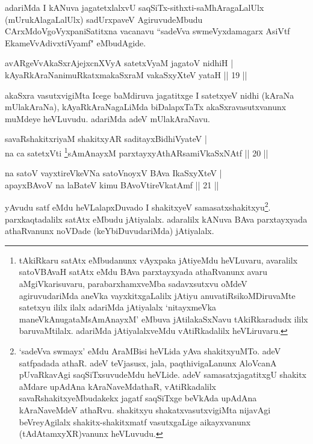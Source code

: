 \begin{artha}
adariMda I kANuva jagatetxlalxvU saqSiTx-sithxti-saMhAragaLalUlx (mUrukAlagaLalUlx) sadUrxpaveV AgiruvudeMbudu CArxMdoVgoVyxpaniSatitxna vacanavu ``sadeVva swmeVyxdamagarx AsiVtf EkameVvAdivxtiVyamf" eMbudAgide.
\end{artha}

\begin{shl}
avARgeVvAkaSxrAjejxcnXVyA satetxVyaM jagatoV nidhiH |\\
kAyaRkAraNanimuRkatxmakaSxraM vakaSxyXteV yataH \hfill || 19 ||
\end{shl}

\begin{artha}
akaSxra vasutxvigiMta Icege baMdiruva jagatitxge I satetxyeV nidhi (kAraNa mUlakAraNa), kAyaRkAraNagaLiMda biDalapxTaTx akaSxravasutxvanunx muMdeye heVLuvudu. adariMda adeV mUlakAraNavu.
\end{artha}

\begin{shl}
savaRshakitxriyaM shakitxyAR saditayxBidhiVyateV |\\
na ca satetxVti \footnote{tAkiRkaru satAtx eMbudanunx vAyxpaka jAtiyeMdu heVLuvaru, avaralilx satoVBAvaH satAtx eMdu BAva parxtayxyada athaRvanunx avaru aMgiVkarisuvaru, parabarxhamxveMba sadavxsutxvu oMdeV agiruvudariMda aneVka vayxkitxgaLalilx jAtiyu anuvatiRsikoMDiruvaMte satetxyu ililx ilalx adariMda jAtiyalalx `nitayxmeVka maneVkAnugataMsAmAnayxM' eMbuva jAtilakaSxNavu tAkiRkaradudx ililx baruvaMtilalx. adariMda jAtiyalalxveMdu vAtiRkadalilx heVLiruvaru.}sAmAnayxM parxtayxyAthARsamiVkaSxNAtf \hfill || 20 ||
\end{shl}

\begin{shl}
na satoV vayxtireVkeVNa satoV\s noyxV BAva IkaSxyXteV |\\
apayxBAvoV na laBateV kimu BAvoV\s tireVkatAmf \hfill || 21 ||
\end{shl}

\begin{artha}
yAvudu satf eMdu heVLalapxDuvado I shakitxyeV samasatxshakitxyu\footnote{`sadeVva swmayx' eMdu AraMBisi heVLida yAva shakitxyuMTo.  adeV satfpadada athaR. adeV teVjasusx, jala, paqthivigaLanunx AloVcanA pUvaRkavAgi saqSiTxsuvudeMdu heVLide. adeV samasatxjagatitxgU shakitx aMdare upAdAna kAraNaveMdathaR, vAtiRkadalilx savaRshakitxyeMbudakekx jagatf saqSiTxge beVkAda upAdAna kAraNaveMdeV athaRvu. shakitxyu shakatxvasutxvigiMta nijavAgi beVreyAgilalx shakitx-shakitxmatf vasutxgaLige aikayxvanunx (tAdAtamxyXR)vanunx heVLuvudu.}. parxkaqtadalilx satAtx eMbudu jAtiyalalx. adaralilx kANuva BAva parxtayxyada athaRvanunx noVDade (keYbiDuvudariMda) jAtiyalalx.
\end{artha}


